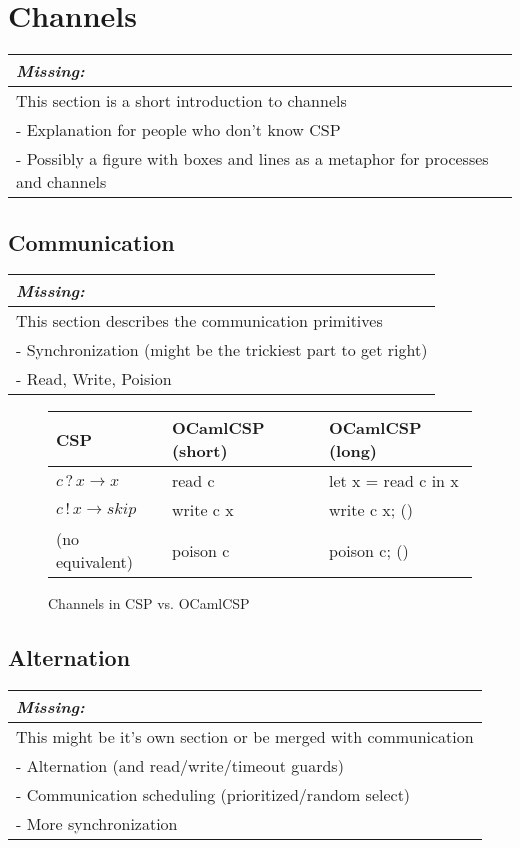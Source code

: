 \documentclass[11pt,oneside,a4paper]{article}
\newcommand{\missing}[1]{
\begin{tabular}{|p{11cm}|}
\hline
\emph{Missing:} \\
\hline
#1
\hline
\end{tabular}
}
\begin{document}
\section{Channels}
\missing{
This section is a short introduction to channels \\
- Explanation for people who don't know CSP \\
- Possibly a figure with boxes and lines as a metaphor for processes and channels \\
}

\subsection{Communication}
\missing{
This section describes the communication primitives \\
- Synchronization (might be the trickiest part to get right) \\
- Read, Write, Poision \\
}

\begin{figure}[h]
\centering
\begin{tabular}{l|l|l}
CSP & OCamlCSP (short) & OCamlCSP (long) \\
\hline
$c\,?\,x \to x$ & read c & let x = read c in x \\
$c\,!\,x \to skip$ & write c x & write c x; () \\
(no equivalent) & poison c & poison c; () \\
\end{tabular}
\caption{Channels in CSP vs. OCamlCSP}
\label{channel-communication}
\end{figure}

\subsection{Alternation}
\missing{
This might be it's own section or be merged with communication \\
- Alternation (and read/write/timeout guards) \\
- Communication scheduling (prioritized/random select) \\
- More synchronization \\
}
\end{document}
